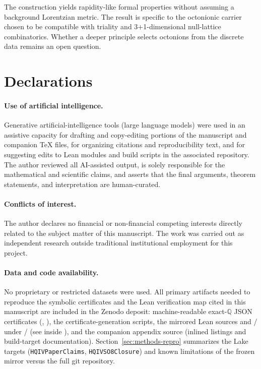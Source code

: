 \documentclass[11pt]{amsart}
\begin{document}
The construction yields rapidity-like formal properties without assuming a background Lorentzian metric. The result is specific to the octonionic carrier chosen to be compatible with triality and 3+1-dimensional null-lattice combinatorics. Whether a deeper principle selects octonions from the discrete data remains an open question.

\section*{Declarations}

\paragraph{Use of artificial intelligence.}
\begin{sloppypar}
Generative artificial-intelligence tools (large language models) were used in an assistive capacity for drafting and copy-editing portions of the manuscript and companion \TeX{} files, for organizing citations and reproducibility text, and for suggesting edits to Lean modules and build scripts in the associated repository. The author reviewed all AI-assisted output, is solely responsible for the mathematical and scientific claims, and asserts that the final arguments, theorem statements, and interpretation are human-curated.
\end{sloppypar}

\paragraph{Conflicts of interest.}
The author declares no financial or non-financial competing interests directly related to the subject matter of this manuscript. The work was carried out as independent research outside traditional institutional employment for this project.

\paragraph{Data and code availability.}
\begin{sloppypar}
No proprietary or restricted datasets were used. All primary artifacts needed to reproduce the symbolic certificates and the Lean verification map cited in this manuscript are included in the Zenodo deposit: machine-readable exact-\(\mathbb{Q}\) JSON certificates (, ), the certificate-generation scripts, the mirrored Lean sources and / under \PaperReproBundleDir/ (see \PaperReproBundleManifest{} inside \CompanionCodeZip{}), and the companion appendix source \cite{so8-appendix} (inlined listings and build-target documentation). Section~\ref{sec:methods-repro} summarizes the Lake targets (\texttt{HQIVPaperClaims}, \texttt{HQIVSO8Closure}) and known limitations of the frozen mirror versus the full git repository.
\end{sloppypar}
\end{document}
